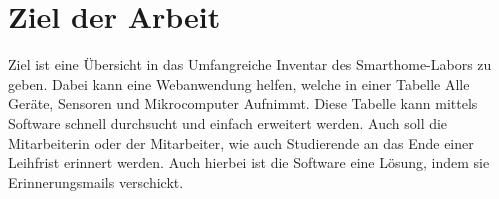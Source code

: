 \section{Ziel der Arbeit}
\label{sec:ziel}
Ziel ist eine Übersicht in das Umfangreiche Inventar des Smarthome-Labors zu geben. Dabei kann eine Webanwendung helfen, welche in einer Tabelle Alle Geräte, Sensoren und Mikrocomputer Aufnimmt. Diese Tabelle kann mittels Software schnell durchsucht und einfach erweitert werden. Auch soll die Mitarbeiterin oder der Mitarbeiter, wie auch Studierende an das Ende einer Leihfrist erinnert werden. Auch hierbei ist die Software eine Lösung, indem sie Erinnerungsmails verschickt.

